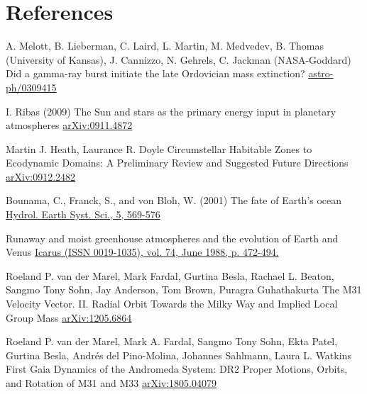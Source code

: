 \documentclass{beamer}
\begin{document}
\section{References}
\begin{frame}[allowframebreaks]
\footnotesize{

\begin{thebibliography}{99}
%
A. Melott, B. Lieberman, C. Laird, L. Martin, M. Medvedev, B. Thomas (University of Kansas), J. Cannizzo, N. Gehrels, C. Jackman (NASA-Goddard) 
\newblock Did a gamma-ray burst initiate the late Ordovician mass extinction?
\newblock \href{http://arxiv.org/abs/astro-ph/0309415}{astro-ph/0309415}

I. Ribas (2009)
\newblock The Sun and stars as the primary energy input in planetary atmospheres
\newblock \href{http://arxiv.org/abs/0911.4872}{arXiv:0911.4872}

Martin J. Heath, Laurance R. Doyle
\newblock Circumstellar Habitable Zones to Ecodynamic Domains: A Preliminary Review and Suggested Future Directions
\newblock \href{http://arxiv.org/abs/0912.2482}{arXiv:0912.2482}

Bounama, C., Franck, S., and von Bloh, W. (2001)
\newblock The fate of Earth's ocean
\newblock \href{http://doi.org/10.1016/0019-1035(88)90116-9}{Hydrol. Earth Syst. Sci., 5, 569-576}

\newblock Runaway and moist greenhouse atmospheres and the evolution of Earth and Venus
\newblock \href{https://doi.org/10.1016/0019-1035(88)90116-9}{Icarus (ISSN 0019-1035), vol. 74, June 1988, p. 472-494.}

Roeland P. van der Marel, Mark Fardal, Gurtina Besla, Rachael L. Beaton, Sangmo Tony Sohn, Jay Anderson, Tom Brown, Puragra Guhathakurta
\newblock The M31 Velocity Vector. II. Radial Orbit Towards the Milky Way and Implied Local Group Mass
\newblock \href{http://arxiv.org/abs/1205.6863}{arXiv:1205.6864}

Roeland P. van der Marel, Mark A. Fardal, Sangmo Tony Sohn, Ekta Patel, Gurtina Besla, Andrés del Pino-Molina, Johannes Sahlmann, Laura L. Watkins
\newblock First Gaia Dynamics of the Andromeda System: DR2 Proper Motions, Orbits, and Rotation of M31 and M33
\newblock \href{http://arxiv.org/abs/1805.04079}{arXiv:1805.04079}

\end{thebibliography}
}
\end{frame}
\end{document}
